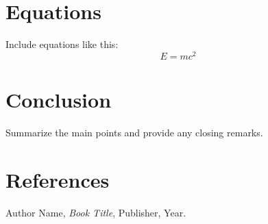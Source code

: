 \documentclass[12pt,a4paper]{article}
\begin{document}
\section{Equations}
Include equations like this:
\begin{equation}
    E = mc^2
\end{equation}

\section{Conclusion}
Summarize the main points and provide any closing remarks.

\section*{References}
\begin{thebibliography}{9}
    Author Name, \textit{Book Title}, Publisher, Year.
\end{thebibliography}
\end{document}
